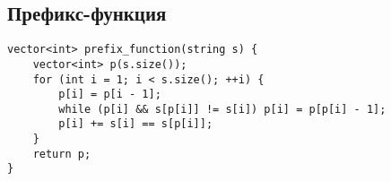 \subsection{Префикс-функция}
\begin{lstlisting}
vector<int> prefix_function(string s) {
    vector<int> p(s.size());
    for (int i = 1; i < s.size(); ++i) {
        p[i] = p[i - 1];
        while (p[i] && s[p[i]] != s[i]) p[i] = p[p[i] - 1];
        p[i] += s[i] == s[p[i]];
    }
    return p;
}
\end{lstlisting}
